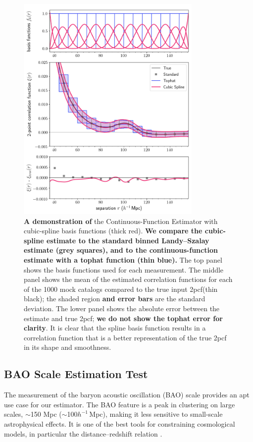 \documentclass[modern]{aastex62}
\newcommand{\cf}{2pcf\xspace}
\newcommand{\est}{the Continuous-Function Estimator\xspace}
\newcommand{\hmpc}{$h^{-1}\,$Mpc}
\newcommand{\new}[1]{\textbf{#1}}
\begin{document}
\begin{figure}[ht]
    \centering
        \includegraphics[width=0.8\textwidth]{xicomparison_2e-4_tophat8_spline}
        \caption{\new{A demonstration of} \est with cubic-spline basis functions (thick red). \new{We compare the cubic-spline estimate to the standard binned Landy--Szalay estimate (grey squares), and to the continuous-function estimate with a tophat function (thin blue).} The top panel shows the basis functions used for each measurement. The middle panel shows the mean of the estimated correlation functions for each of the 1000 mock catalogs compared to the true input \cf (thin black); the shaded region \new{and error bars} are the standard deviation. The lower panel shows the absolute error between the estimate and true \cf; \new{we do not show the tophat error for clarity}. It is clear that the spline basis function results in a correlation function that is a better representation of the true \cf in its shape and smoothness.}
        \label{fig:spline}
    \end{figure}    

\subsection{BAO Scale Estimation Test}
\label{sec:bao}

The measurement of the baryon acoustic oscillation (BAO) scale provides an apt use case for our estimator.
The BAO feature is a peak in clustering on large scales, $\sim$150 Mpc ($\sim$100\hmpc), making it less sensitive to small-scale astrophysical effects.
It is one of the best tools for constraining cosmological models, in particular the distance--redshift relation \citep{Cole2005, Eisenstein2005, Kazin2010, Anderson2012, Anderson2014, Alam2016}.
\end{document}

